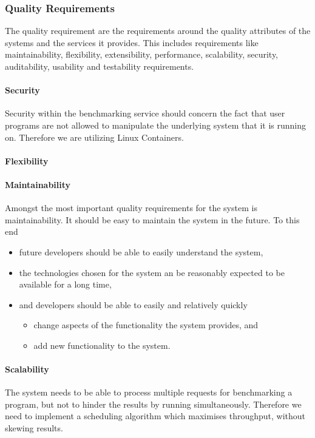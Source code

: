 \subsubsection{Quality Requirements}
\label{sec:qualityRequirementManagementSystem}
The quality requirement are the requirements around the quality attributes of
the systems and the services it provides. This includes requirements like
maintainability, flexibility, extensibility, performance, scalability, security,
auditability, usability and testability requirements.
\paragraph{Security}
Security within the benchmarking service should concern the fact that user programs
are not allowed to manipulate the underlying system that it is running on.
Therefore we are utilizing Linux Containers.

\paragraph{Flexibility}
\paragraph{Maintainability}
Amongst the most important quality requirements for the system is
maintainability. It should be easy to maintain the system in the future. To this end

\begin{itemize}
\item future developers should be able to easily understand the system,
\item the technologies chosen for the system an be reasonably expected to be available for a long
time,
\item and developers should be able to easily and relatively quickly
	\begin{itemize}
		\item change aspects of the functionality the system provides, and
		\item add new functionality to the system.
	\end{itemize}
\end{itemize}

\paragraph{Scalability}
The system needs to be able to process multiple requests for benchmarking a program,
but not to hinder the results by running simultaneously. Therefore we need to
implement a scheduling algorithm which maximises throughput, without skewing results.

